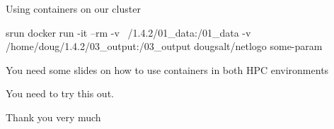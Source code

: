 \documentclass[usenames,dvipsnames,10pt]{beamer}
\begin{document}
\begin{frame}{Using containers on our cluster}

    \vfill
    srun docker run -it --rm -v ~/1.4.2/01\_data:/01\_data -v /home/doug/1.4.2/03\_output:/03\_output dougsalt/netlogo some-param

    You need some slides on how to use containers in both HPC environments

    You need to try this out.
    \vfill

\end{frame}

\begin{frame}
    Thank you very much
    \finalpage
\end{frame}
\end{document}
